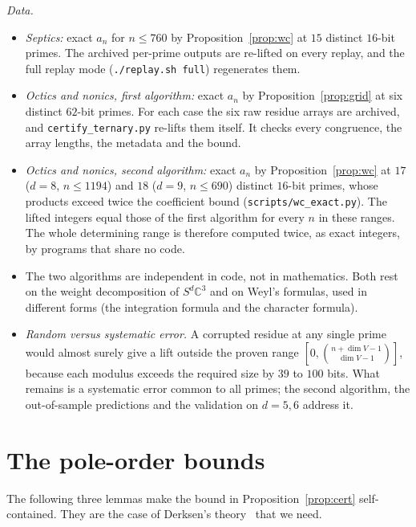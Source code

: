 \documentclass[11pt]{amsart}
\theoremstyle{definition}
\theoremstyle{remark}
\newcommand{\C}{\mathbb{C}}
\begin{document}
\emph{Data.}
\begin{itemize}
\item \emph{Septics:} exact $a_n$ for $n\le760$ by Proposition~\ref{prop:wc} at $15$ distinct $16$-bit primes. The archived per-prime outputs are re-lifted on every replay, and the full replay mode (\texttt{./replay.sh full}) regenerates them.
\item \emph{Octics and nonics, first algorithm:} exact $a_n$ by Proposition~\ref{prop:grid} at six distinct $62$-bit primes. For each case the six raw residue arrays are archived, and \texttt{certify\_ternary.py} re-lifts them itself. It checks every congruence, the array lengths, the metadata and the bound.
\item \emph{Octics and nonics, second algorithm:} exact $a_n$ by Proposition~\ref{prop:wc} at $17$ ($d=8$, $n\le1194$) and $18$ ($d=9$, $n\le690$) distinct $16$-bit primes, whose products exceed twice the coefficient bound (\texttt{scripts/wc\_exact.py}). The lifted integers equal those of the first algorithm for every $n$ in these ranges. The whole determining range is therefore computed twice, as exact integers, by programs that share no code.
\item The two algorithms are independent in code, not in mathematics. Both rest on the weight decomposition of $S^d\C^3$ and on Weyl's formulas, used in different forms (the integration formula and the character formula).
\item \emph{Random versus systematic error.} A corrupted residue at any single prime would almost surely give a lift outside the proven range $[0,\binom{n+\dim V-1}{\dim V-1}]$, because each modulus exceeds the required size by $39$ to $100$ bits. What remains is a systematic error common to all primes; the second algorithm, the out-of-sample predictions and the validation on $d=5,6$ address it.
\end{itemize}

\section{The pole-order bounds}\label{sec:torus}

The following three lemmas make the bound in Proposition~\ref{prop:cert} self-contained. They are the case of Derksen's theory~\cite[\S\S1--5]{Der05} that we need.
\end{document}
